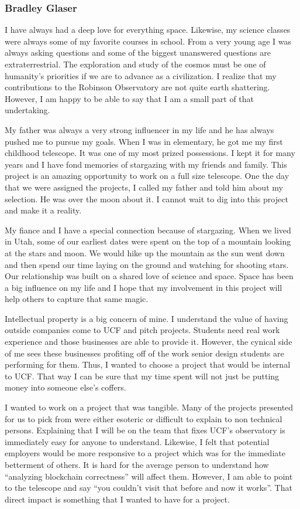 \documentclass[12pt]{article}
\begin{document}
\subsubsection{Bradley Glaser}

I have always had a deep love for everything space. Likewise, my science classes were always some of my favorite courses in school. From a very young age I was always asking questions and some of the biggest unanswered questions are extraterrestrial. The exploration and study of the cosmos must be one of humanity’s priorities if we are to advance as a civilization. I realize that my contributions to the Robinson Observatory are not quite earth shattering. However, I am happy to be able to say that I am a small part of that undertaking.

My father was always a very strong influencer in my life and he has always pushed me to pursue my goals. When I was in elementary, he got me my first childhood telescope. It was one of my most prized possessions. I kept it for many years and I have fond memories of stargazing with my friends and family. This project is an amazing opportunity to work on a full size telescope. One the day that we were assigned the projects, I called my father and told him about my selection. He was over the moon about it. I cannot wait to dig into this project and make it a reality.

My fiance and I have a special connection because of stargazing. When we lived in Utah, some of our earliest dates were spent on the top of a mountain looking at the stars and moon. We would hike up the mountain as the sun went down and then spend our time laying on the ground and watching for shooting stars. Our relationship was built on a shared love of science and space. Space has been a big influence on my life and I hope that my involvement in this project will help others to capture that same magic.

Intellectual property is a big concern of mine. I understand the value of having outside companies come to UCF and pitch projects. Students need real work experience and those businesses are able to provide it. However, the cynical side of me sees these businesses profiting off of the work senior design students are performing for them. Thus, I wanted to choose a project that would be internal to UCF. That way I can be sure that my time spent will not just be putting money into someone else’s coffers.

I wanted to work on a project that was tangible. Many of the projects presented for us to pick from were either esoteric or difficult to explain to non technical persons. Explaining that I will be on the team that fixes UCF’s observatory is immediately easy for anyone to understand. Likewise, I felt that potential employers would be more responsive to a project which was for the immediate betterment of others. It is hard for the average person to understand how “analyzing blockchain correctness” will affect them. However, I am able to point to the telescope and say “you couldn’t visit that before and now it works”. That direct impact is something that I wanted to have for a project.
\end{document}

